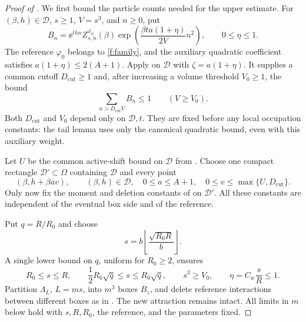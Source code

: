 \begin{proof}[Proof of ]
We first bound the particle counts needed for the upper estimate.
For $(\beta,h)\in\mathcal D$, $s\ge1$, $V=s^3$, and $n\ge0$, put
\[
 B_n=\ee^{thn}Z^{\varphi_0}_{s,n}(\beta)
          \exp\!\left(\frac{\beta ta(1+\eta)}{2V}n^2\right),
 \qquad 0\le\eta\le1.
\]
The reference $\varphi_0$ belongs to \eqref{f:family}, and the
auxiliary quadratic coefficient satisfies $a(1+\eta)\le2(A+1)$.
Apply  on $\mathcal D$ with
$\zeta=a(1+\eta)$.  It supplies a common cutoff
$D_{\mathrm{cut}}\ge1$ and, after increasing a volume threshold
$V_0\ge1$, the bound
\begin{equation}
 \sum_{n>D_{\mathrm{cut}}V}B_n\le1
 \qquad(V\ge V_0).
 \label{k:grand-tail}
\end{equation}
Both $D_{\mathrm{cut}}$ and $V_0$ depend only on $\mathcal D,t$.
They are fixed before any local occupation constants: the tail lemma
uses only the canonical quadratic bound, even with this auxiliary
weight.

Let $U$ be the common active-shift bound on $\mathcal D$ from
.  Choose one compact rectangle
$\mathcal D'\subset\Omega$ containing $\mathcal D$ and every point
\begin{equation}
 (\beta,h+\beta av),\qquad
 (\beta,h)\in\mathcal D,\quad
 0\le a\le A+1,\quad 0\le v\le\max\{U,D_{\mathrm{cut}}\}.
 \label{k:shifted-compact}
\end{equation}
Only now fix the moment and deletion constants of
 on $\mathcal D'$.  All these constants
are independent of the eventual box side and of the reference.

Put $q=R/R_0$ and choose
\begin{equation}
 s=b\left\lfloor\frac{\sqrt{R_0R}}b\right\rfloor.
 \label{k:box-side}
\end{equation}
A single lower bound on $q$, uniform for $R_0\ge2$, ensures
\begin{equation}
 R_0\le s\le R,\qquad
 \frac12R_0\sqrt q\le s\le R_0\sqrt q,\qquad
 s^3\ge V_0,\qquad
 \eta=C_w\frac sR\le1.
 \label{k:ratio-conditions}
\end{equation}
Partition $\Lambda_L$, $L=ms$, into $m^3$ boxes $B_z$, and delete
reference interactions between different boxes as in
.  The new attraction remains intact.  All limits
in $m$ below hold with $s,R,R_0$, the reference, and the parameters fixed.


\end{proof}

